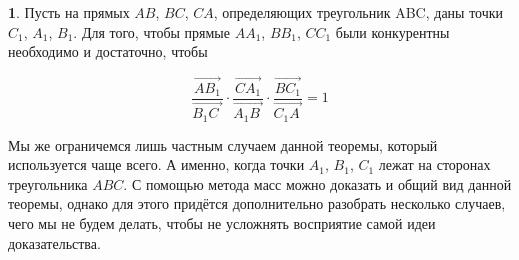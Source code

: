 \documentclass[14pt]{extarticle}
\let\Overrightarrow\overrightarrow
\theoremstyle{definition}
\theoremstyle{theorem}
\newenvironment{namedtheorem}[2]
{
\newcommand{\foo}{#1}
\newtheorem*{\foo{}}{\normalfont\fontsize{15}{15}{Теорема #2}}
\begin{\foo{}}
}
{\end{\foo{}}}
\begin{document}
\begin{namedtheorem}{ceva}{Чевы}
	Пусть на прямых $AB$, $BC$, $CA$, определяющих
    треугольник ABC, даны точки $C_1$, $A_1$, $B_1$. Для того, чтобы прямые
    $AA_1$, $BB_1$, $CC_1$ были конкурентны
    необходимо и достаточно, чтобы
	
	\begin{ceqn}
	\[
    \dfrac{\Overrightarrow{AB_1}}{\Overrightarrow{B_1C_{\, \,}}} \cdot 
	\dfrac{\Overrightarrow{CA_1}}
	{\Overrightarrow{A_1B_{\:}}} \cdot \dfrac{\Overrightarrow{BC_1}}
	{\Overrightarrow{C_1A_{\,}}} = 1
	\]
    \end{ceqn}

\end{namedtheorem}


Мы же ограничемся лишь частным случаем данной теоремы, который используется 
чаще всего. А именно, когда точки \(A_1\), \(B_1\), \(C_1\) лежат на сторонах 
треугольника \(ABC\). С помощью метода масс можно доказать и общий вид данной 
теоремы, однако для этого придётся дополнительно разобрать несколько случаев, 
чего мы не будем делать, чтобы не усложнять восприятие самой идеи доказательства.\\ 

\begin{figure}
	\hspace{-0.3cm}
	\vspace{-2cm}
	\vspace{1cm}
\end{figure}
\end{document}
